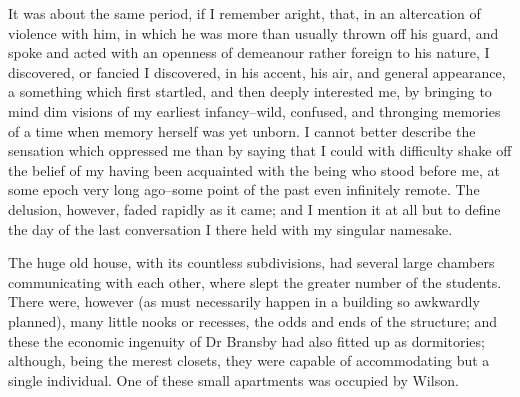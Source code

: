 \documentclass[12pt]{article}
\begin{document}
     It was about the same period, if I remember aright, that, in
an altercation of violence with him, in which he was more than
usually thrown off his guard, and spoke and acted with an openness
of demeanour rather foreign to his nature, I discovered, or fancied
I discovered, in his accent, his air, and general appearance, a
something which first startled, and then deeply interested me, by
bringing to mind dim visions of my earliest infancy--wild, 
confused, and thronging memories of a time when memory herself was
yet unborn.  I cannot better describe the sensation which oppressed
me than by saying that I could with difficulty shake off the belief
of my having been acquainted with the being who stood before me, at
some epoch very long ago--some point of the past even infinitely
remote.  The delusion, however, faded rapidly as it came; and I
mention it at all but to define the day of the last conversation I
there held with my singular namesake.

     The huge old house, with its countless subdivisions, had
several large chambers communicating with each other, where slept
the greater number of the students.  There were, however (as must
necessarily happen in a building so awkwardly planned), many little
nooks or recesses, the odds and ends of the structure; and these
the economic ingenuity of Dr Bransby had also fitted up as
dormitories; although, being the merest closets, they were capable
of accommodating but a single individual.  One of these small
apartments was occupied by Wilson.
\end{document}
